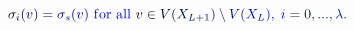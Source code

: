 \documentclass[12pt]{article}
\begin{document}
\makeatletter
\renewcommand*{\@textcolor}[3]{%
  \protect\leavevmode
  \begingroup
    \color#1{#2}#3%
  \endgroup
}
\makeatother
\begin{displaymath}
\mathcolor[RGB]{0,0,15}{\sigma} _ { \mathcolor[RGB]{0,0,30}{i} } \mathcolor[RGB]{0,0,45}{(} \mathcolor[RGB]{0,0,60}{v} \mathcolor[RGB]{0,0,75}{)} \mathcolor[RGB]{0,0,90}{=} \mathcolor[RGB]{0,0,105}{\sigma} _ { \mathcolor[RGB]{0,0,120}{s} } \mathcolor[RGB]{0,0,135}{(} \mathcolor[RGB]{0,0,150}{v} \mathcolor[RGB]{0,0,165}{)} \mathrm { ~ \mathcolor[RGB]{0,0,180}{f} \mathcolor[RGB]{0,0,195}{o} \mathcolor[RGB]{0,0,210}{r} ~ \mathcolor[RGB]{0,0,225}{a} \mathcolor[RGB]{0,0,240}{l} \mathcolor[RGB]{0,0,255}{l} ~ } \mathcolor[RGB]{0,15,0}{v} \mathcolor[RGB]{0,15,15}{\in} \mathcolor[RGB]{0,15,30}{V} \mathcolor[RGB]{0,15,45}{(} \mathcolor[RGB]{0,15,60}{X} _ { \mathcolor[RGB]{0,15,75}{L} \mathcolor[RGB]{0,15,90}{+} \mathcolor[RGB]{0,15,105}{1} } \mathcolor[RGB]{0,15,120}{)} \mathcolor[RGB]{0,15,135}{\setminus} \mathcolor[RGB]{0,15,150}{V} \mathcolor[RGB]{0,15,165}{(} \mathcolor[RGB]{0,15,180}{X} _ { \mathcolor[RGB]{0,15,195}{L} } \mathcolor[RGB]{0,15,210}{)} \mathcolor[RGB]{0,15,225}{,} \mathcolor[RGB]{0,15,240}{\;} \mathcolor[RGB]{0,15,255}{i} \mathcolor[RGB]{0,30,0}{=} \mathcolor[RGB]{0,30,15}{0} \mathcolor[RGB]{0,30,30}{,} \mathcolor[RGB]{0,30,45}{.} \mathcolor[RGB]{0,30,60}{.} \mathcolor[RGB]{0,30,75}{.} \mathcolor[RGB]{0,30,90}{,} \mathcolor[RGB]{0,30,105}{\lambda} \mathcolor[RGB]{0,30,120}{.}
\end{displaymath}
\end{document}
